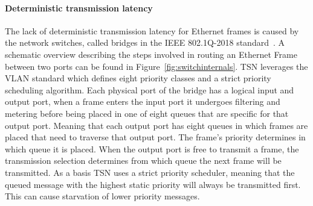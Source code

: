 \paragraph{Deterministic transmission latency} The lack of deterministic transmission latency for Ethernet frames is caused by the network switches, called bridges in the IEEE 802.1Q-2018 standard~\cite{IEEE8021Q}. A schematic overview describing the steps involved in routing an Ethernet Frame between two ports can be found in Figure~\ref{fig:switchinternals}. TSN leverages the VLAN standard which defines eight priority classes and a strict priority scheduling algorithm. Each physical port of the bridge has a logical input and output port, when a frame enters the input port it undergoes filtering and metering before being placed in one of eight queues that are specific for that output port. Meaning that each output port has eight queues in which frames are placed that need to traverse that output port. The frame's priority determines in which queue it is placed. When the output port is free to transmit a frame, the transmission selection determines from which queue the next frame will be transmitted. As a basis TSN uses a strict priority scheduler, meaning that the queued message with the highest static priority will always be transmitted first. This can cause starvation of lower priority messages.

